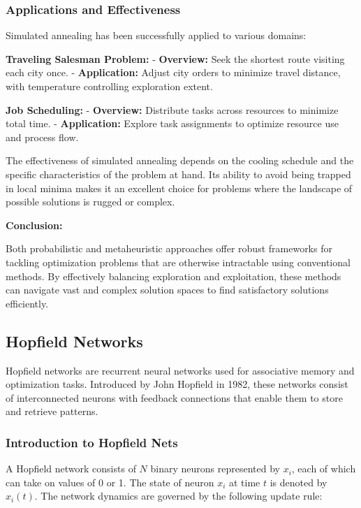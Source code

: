 \documentclass[12pt]{book} %
\begin{document}
\subsubsection{Applications and Effectiveness}

Simulated annealing has been successfully applied to various domains:

\textbf{Traveling Salesman Problem:}
- \textbf{Overview:} Seek the shortest route visiting each city once.
- \textbf{Application:} Adjust city orders to minimize travel distance, with temperature controlling exploration extent.

\textbf{Job Scheduling:}
- \textbf{Overview:} Distribute tasks across resources to minimize total time.
- \textbf{Application:} Explore task assignments to optimize resource use and process flow.

The effectiveness of simulated annealing depends on the cooling schedule and the specific characteristics of the problem at hand. Its ability to avoid being trapped in local minima makes it an excellent choice for problems where the landscape of possible solutions is rugged or complex.

\textbf{Conclusion:}

Both probabilistic and metaheuristic approaches offer robust frameworks for tackling optimization problems that are otherwise intractable using conventional methods. By effectively balancing exploration and exploitation, these methods can navigate vast and complex solution spaces to find satisfactory solutions efficiently.

\subsection{Hopfield Networks}

Hopfield networks are recurrent neural networks used for associative memory and optimization tasks. Introduced by John Hopfield in 1982, these networks consist of interconnected neurons with feedback connections that enable them to store and retrieve patterns.

\subsubsection{Introduction to Hopfield Nets}

A Hopfield network consists of $N$ binary neurons represented by $x_i$, each of which can take on values of 0 or 1. The state of neuron $x_i$ at time $t$ is denoted by $x_i(t)$. The network dynamics are governed by the following update rule:
\end{document}
